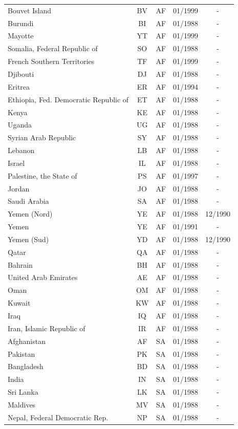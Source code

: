 \begin{small}
\begin{longtable}{p{7.5cm}cccc}
Bouvet Island	&	BV	&	AF	&	01/1999	&	-	\\
Burundi	&	BI	&	AF	&	01/1988	&	-	\\
Mayotte	&	YT	&	AF	&	01/1999	&	-	\\
Somalia, Federal Republic of	&	SO	&	AF	&	01/1988	&	-	\\
French Southern Territories	&	TF	&	AF	&	01/1999	&	-	\\
Djibouti	&	DJ	&	AF	&	01/1988	&	-	\\
Eritrea	&	ER	&	AF	&	01/1994	&	-	\\
Ethiopia, Fed. Democratic Republic of	&	ET	&	AF	&	01/1988	&	-	\\
Kenya	&	KE	&	AF	&	01/1988	&	-	\\
Uganda	&	UG	&	AF	&	01/1988	&	-	\\
Syrian Arab Republic	&	SY	&	AF	&	01/1988	&	-	\\
Lebanon	&	LB	&	AF	&	01/1988	&	-	\\
Israel	&	IL	&	AF	&	01/1988	&	-	\\
Palestine, the State of	&	PS	&	AF	&	01/1997	&	-	\\
Jordan	&	JO	&	AF	&	01/1988	&	-	\\
Saudi Arabia	&	SA	&	AF	&	01/1988	&	-	\\
Yemen (Nord)	&	YE	&	AF	&	01/1988	&	12/1990	\\
Yemen	&	YE	&	AF	&	01/1991	&	-	\\
Yemen (Sud)	&	YD	&	AF	&	01/1988	&	12/1990	\\
Qatar	&	QA	&	AF	&	01/1988	&	-	\\
Bahrain	&	BH	&	AF	&	01/1988	&	-	\\
United Arab Emirates	&	AE	&	AF	&	01/1988	&	-	\\
Oman	&	OM	&	AF	&	01/1988	&	-	\\
Kuwait	&	KW	&	AF	&	01/1988	&	-	\\
Iraq	&	IQ	&	AF	&	01/1988	&	-	\\
Iran, Islamic Republic of	&	IR	&	AF	&	01/1988	&	-	\\
Afghanistan	&	AF	&	SA	&	01/1988	&	-	\\
Pakistan	&	PK	&	SA	&	01/1988	&	-	\\
Bangladesh	&	BD	&	SA	&	01/1988	&	-	\\
India	&	IN	&	SA	&	01/1988	&	-	\\
Sri Lanka	&	LK	&	SA	&	01/1988	&	-	\\
Maldives	&	MV	&	SA	&	01/1988	&	-	\\
Nepal, Federal Democratic Rep.	&	NP	&	SA	&	01/1988	&	-	\\

\end{longtable}
\end{small}
